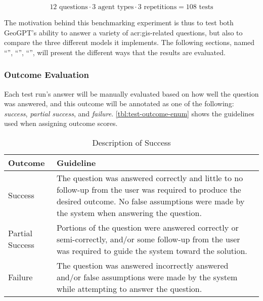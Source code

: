 $$12 \text{ questions} \cdot 3 \text{ agent types} \cdot 3 \text{ repetitions} = 108 \text{ tests}$$

The motivation behind this benchmarking experiment is thus to test both GeoGPT's ability to answer a variety of \acrshort{acr:gis}-related questions, but also to compare the three different models it implements. The following sections, named \enquote{}, \enquote{}, \enquote{}, will present the different ways that the results are evaluated.

\subsubsection{Outcome Evaluation}
\label{subsubsec:outcome-evaluation}

Each test run's answer will be manually evaluated based on how well the question was answered, and this outcome will be annotated as one of the following: \textit{success}, \textit{partial success}, and \textit{failure}. \autoref{tbl:test-outcome-enum} shows the guidelines used when assigning outcome scores.

\begin{table}[htbp]
    \centering
    \caption{Description of Success}
    \label{tbl:test-outcome-enum}
    \begin{tabularx}{0.9\textwidth}{p{3cm}X}
        \toprule
        \textbf{Outcome} & \textbf{Guideline}                                                                                                                                                                                  \\
        \midrule
        Success          & The question was answered correctly and little to no follow-up from the user was required to produce the desired outcome. No false assumptions were made by the system when answering the question. \\
        Partial Success  & Portions of the question were answered correctly or semi-correctly, and/or some follow-up from the user was required to guide the system toward the solution.                                       \\
        Failure          & The question was answered incorrectly answered and/or false assumptions were made by the system while attempting to answer the question.                                                            \\
        \bottomrule
    \end{tabularx}
\end{table}


